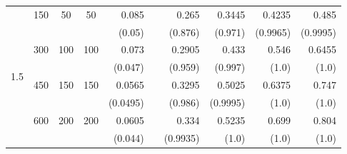 \begin{table}[htbp]
\begin{tabular}{ccccrrrrrr}
            \midrule
        \multirow{8}{*}{1.5}
            & 150 & 50 & 50 & 0.085 &       & 0.265 & 0.3445 & 0.4235 & 0.485 \\
            &     &     &     & (0.05) &       & (0.876) & (0.971) & (0.9965) & (0.9995) \\
            & 300 & 100 & 100 & 0.073 &       & 0.2905 & 0.433 & 0.546 & 0.6455 \\
            &     &     &     & (0.047) &       & (0.959) & (0.997) & (1.0) & (1.0) \\
            & 450 & 150 & 150 & 0.0565 &       & 0.3295 & 0.5025 & 0.6375 & 0.747 \\
            &     &     &     & (0.0495) &       & (0.986) & (0.9995) & (1.0) & (1.0) \\
            & 600 & 200 & 200 & 0.0605 &       & 0.334 & 0.5235 & 0.699 & 0.804 \\
            &     &     &     & (0.044) &       & (0.9935) & (1.0) & (1.0) & (1.0) \\

        \bottomrule

    \end{tabular}

\end{table}
